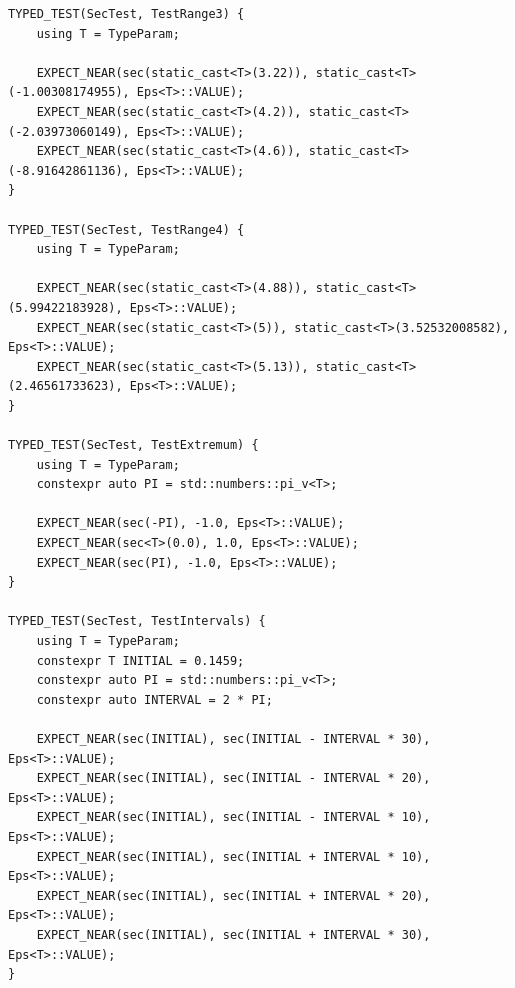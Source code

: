 \documentclass[12pt,a4paper]{report}
\begin{document}
\begin{verbatim}
TYPED_TEST(SecTest, TestRange3) {
    using T = TypeParam;

    EXPECT_NEAR(sec(static_cast<T>(3.22)), static_cast<T>(-1.00308174955), Eps<T>::VALUE);
    EXPECT_NEAR(sec(static_cast<T>(4.2)), static_cast<T>(-2.03973060149), Eps<T>::VALUE);
    EXPECT_NEAR(sec(static_cast<T>(4.6)), static_cast<T>(-8.91642861136), Eps<T>::VALUE);
}

TYPED_TEST(SecTest, TestRange4) {
    using T = TypeParam;

    EXPECT_NEAR(sec(static_cast<T>(4.88)), static_cast<T>(5.99422183928), Eps<T>::VALUE);
    EXPECT_NEAR(sec(static_cast<T>(5)), static_cast<T>(3.52532008582), Eps<T>::VALUE);
    EXPECT_NEAR(sec(static_cast<T>(5.13)), static_cast<T>(2.46561733623), Eps<T>::VALUE);
}

TYPED_TEST(SecTest, TestExtremum) {
    using T = TypeParam;
    constexpr auto PI = std::numbers::pi_v<T>;

    EXPECT_NEAR(sec(-PI), -1.0, Eps<T>::VALUE);
    EXPECT_NEAR(sec<T>(0.0), 1.0, Eps<T>::VALUE);
    EXPECT_NEAR(sec(PI), -1.0, Eps<T>::VALUE);
}

TYPED_TEST(SecTest, TestIntervals) {
    using T = TypeParam;
    constexpr T INITIAL = 0.1459;
    constexpr auto PI = std::numbers::pi_v<T>;
    constexpr auto INTERVAL = 2 * PI;

    EXPECT_NEAR(sec(INITIAL), sec(INITIAL - INTERVAL * 30), Eps<T>::VALUE);
    EXPECT_NEAR(sec(INITIAL), sec(INITIAL - INTERVAL * 20), Eps<T>::VALUE);
    EXPECT_NEAR(sec(INITIAL), sec(INITIAL - INTERVAL * 10), Eps<T>::VALUE);
    EXPECT_NEAR(sec(INITIAL), sec(INITIAL + INTERVAL * 10), Eps<T>::VALUE);
    EXPECT_NEAR(sec(INITIAL), sec(INITIAL + INTERVAL * 20), Eps<T>::VALUE);
    EXPECT_NEAR(sec(INITIAL), sec(INITIAL + INTERVAL * 30), Eps<T>::VALUE);
}
\end{verbatim}
\end{document}
